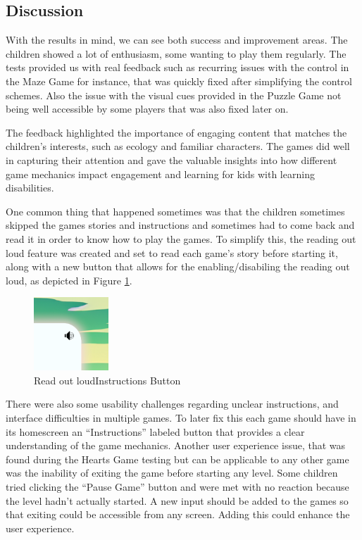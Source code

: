 \newpage
\subsection{Discussion}

With the results in mind, we can see both success and improvement areas. The children showed a lot of enthusiasm, some wanting to play them regularly. The tests provided us with real feedback such as recurring issues with the control in the Maze Game for instance, that was quickly fixed after simplifying the control schemes. Also the issue with the visual cues provided in the Puzzle Game not being well accessible by some players that was also fixed later on.


The feedback highlighted the importance of engaging content that matches the children’s interests, such as ecology and familiar characters. The games did well in capturing their attention and gave the valuable insights into how different game mechanics impact engagement and learning for kids with learning disabilities.

One common thing that happened sometimes was that the children sometimes skipped the games stories and instructions and sometimes had to come back and read it in order to know how to play the games. To simplify this, the reading out loud feature was created and set to read each game's story before starting it, along with a new button that allows for the enabling/disabiling the reading out loud, as depicted in Figure \ref{fig:readInstructionsButton}.

\begin{figure}[!h]
    \centering
    \includegraphics[width=0.3\linewidth]{Chapters/game_changes/read-sound-icon.png}
    \caption{Read out loudInstructions Button}
    \label{fig:readInstructionsButton}
\end{figure}


There were also some usability challenges regarding unclear instructions, and interface difficulties in multiple games. To later fix this each game should have in its homescreen an ``Instructions'' labeled button that provides a clear understanding of the game mechanics. Another user experience issue, that was found during the Hearts Game testing but can be applicable to any other game was the inability of exiting the game before starting any level. Some children tried clicking the ``Pause Game'' button and were met with no reaction because the level hadn't actually started. A new input should be added to the games so that exiting could be accessible from any screen. Adding this could enhance the user experience.

